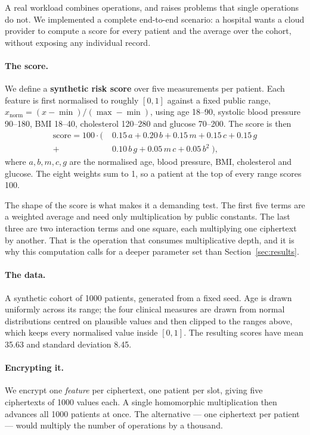 \documentclass[11pt,a4paper]{article}
\begin{document}
A real workload combines operations, and raises problems that single operations do
not. We implemented a complete end-to-end scenario: a hospital wants a cloud provider
to compute a score for every patient and the average over the cohort, without
exposing any individual record.

\paragraph{The score.} We define a \textbf{synthetic risk score} over five
measurements per patient. Each feature is first normalised to
roughly $[0,1]$ against a fixed public range,
$x_{\text{norm}} = (x - \min)/(\max - \min)$, using age 18--90, systolic blood
pressure 90--180, BMI 18--40, cholesterol 120--280 and glucose 70--200. The score is
then
\begin{align*}
\text{score} = 100 \cdot \big(\;
& 0.15\,a + 0.20\,b + 0.15\,m + 0.15\,c + 0.15\,g \\
+\; & 0.10\,b\,g + 0.05\,m\,c + 0.05\,b^{2} \;\big),
\end{align*}
where $a,b,m,c,g$ are the normalised age, blood pressure, BMI, cholesterol and
glucose. The eight weights sum to 1, so a patient at the top of every range scores
100.

The shape of the score is what makes it a demanding test. The first five terms are a
weighted average and need only multiplication by public constants. The last three
are two interaction terms and one square, each multiplying one ciphertext by
another. That is the operation that consumes multiplicative depth, and it is why
this computation calls for a deeper parameter set than Section~\ref{sec:results}.

\paragraph{The data.} A synthetic cohort of 1000 patients, generated from a fixed
seed. Age is drawn uniformly across its range; the four clinical measures are drawn
from normal distributions centred on plausible values and then clipped to the ranges
above, which keeps every normalised value inside $[0,1]$. The resulting scores have
mean 35.63 and standard deviation 8.45.

\paragraph{Encrypting it.} We encrypt one \emph{feature} per ciphertext, one patient
per slot, giving five ciphertexts of 1000 values each. A single homomorphic
multiplication then advances all 1000 patients at once. The alternative --- one
ciphertext per patient --- would multiply the number of operations by a thousand.
\end{document}
